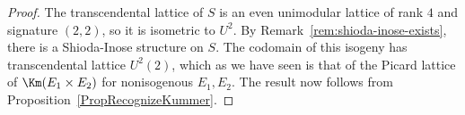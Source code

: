 \documentclass{article}
\DeclareMathOperator{\car}{{\rm char}}
\def\P{\mathbf{P}}
\newcommand{\II}{\mathrm{II}}
\newcommand{\I}{\mathrm{I}}
\begin{document}
\begin{proof} The transcendental lattice of $S$ is an even unimodular lattice
  of rank $4$ and signature $(2,2)$, so it is isometric to $U^2$.  By
  Remark~\ref{rem:shioda-inose-exists}, there is a Shioda-Inose structure on
  $S$.  The codomain of this isogeny has transcendental lattice $U^2(2)$,
  which as we have seen is that of the Picard lattice of $\Km(E_1 \times E_2)$
  for nonisogenous $E_1, E_2$.  The result now follows from
  Proposition~\ref{PropRecognizeKummer}.
\end{proof}


  
\end{document}

